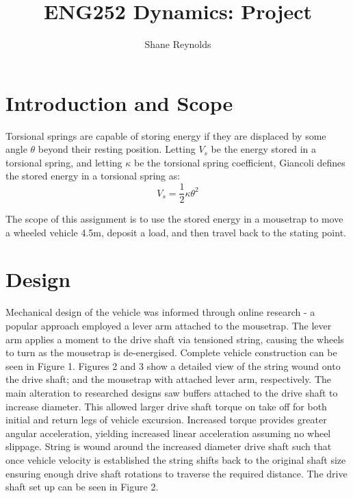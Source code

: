 \documentclass[a4paper]{article}
\begin{document}
\title{ENG252 Dynamics: Project}
\author{Shane Reynolds}
\maketitle

\section{Introduction and Scope}
Torsional springs are capable of storing energy if they are displaced by some angle $\theta$ beyond their resting position. Letting $V_s$ be the energy stored in a torsional spring, and letting $\kappa$ be the torsional spring coefficient, Giancoli \cite{Giancoli:2000} defines the stored energy in a torsional spring as:
\begin{equation}
	V_s = \frac{1}{2} \kappa \theta^2
\end{equation}

The scope of this assignment is to use the stored energy in a mousetrap to move a wheeled vehicle 4.5$\si{\meter}$, deposit a load, and then travel back to the stating point.

\section{Design}
Mechanical design of the vehicle was informed through online research - a popular approach employed a lever arm attached to the mousetrap. The lever arm applies a moment to the drive shaft via tensioned string, causing the wheels to turn as the mousetrap is de-energised. Complete vehicle construction can be seen in Figure 1. Figures 2 and 3 show a detailed view of the string wound onto the drive shaft; and the mousetrap with attached lever arm, respectively. The main alteration to researched designs saw buffers attached to the drive shaft to increase diameter. This allowed larger drive shaft torque on take off for both initial and return legs of vehicle excursion. Increased torque provides greater angular acceleration, yielding increased linear acceleration assuming no wheel slippage. String is wound around the increased diameter drive shaft such that once vehicle velocity is established the string shifts back to the original shaft size ensuring enough drive shaft rotations to traverse the required distance. The drive shaft set up can be seen in Figure 2.
\end{document}

